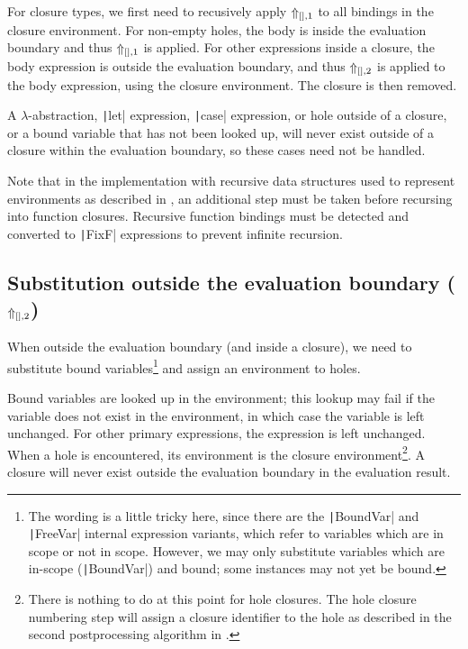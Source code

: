 For closure types, we first need to recusively apply $\Uparrow_{[],1}$ to all bindings in the closure environment. For non-empty holes, the body is inside the evaluation boundary and thus $\Uparrow_{[],1}$ is applied. For other expressions inside a closure, the body expression is outside the evaluation boundary, and thus $\Uparrow_{[],2}$ is applied to the body expression, using the closure environment. The closure is then removed.

A $\lambda$-abstraction, \texttt|let| expression, \texttt|case| expression, or hole outside of a closure, or a bound variable that has not been looked up, will never exist outside of a closure within the evaluation boundary, so these cases need not be handled.

Note that in the implementation with recursive data structures used to represent environments as described in , an additional step must be taken before recursing into function closures. Recursive function bindings must be detected and converted to \texttt|FixF| expressions to prevent infinite recursion.

\subsection{Substitution outside the evaluation boundary ($\Uparrow_{[],2}$)}
\label{sec:postprocessing-subst-outside}

When outside the evaluation boundary (and inside a closure), we need to substitute bound variables\footnote{The wording is a little tricky here, since there are the \texttt|BoundVar| and \texttt|FreeVar| internal expression variants, which refer to variables which are in scope or not in scope. However, we may only substitute variables which are in-scope (\texttt|BoundVar|) and bound; some instances may not yet be bound.} and assign an environment to holes.

Bound variables are looked up in the environment; this lookup may fail if the variable does not exist in the environment, in which case the variable is left unchanged. For other primary expressions, the expression is left unchanged. When a hole is encountered, its environment is the closure environment\footnote{There is nothing to do at this point for hole closures. The hole closure numbering step will assign a closure identifier to the hole as described in the second postprocessing algorithm in .}. A closure will never exist outside the evaluation boundary in the evaluation result.

